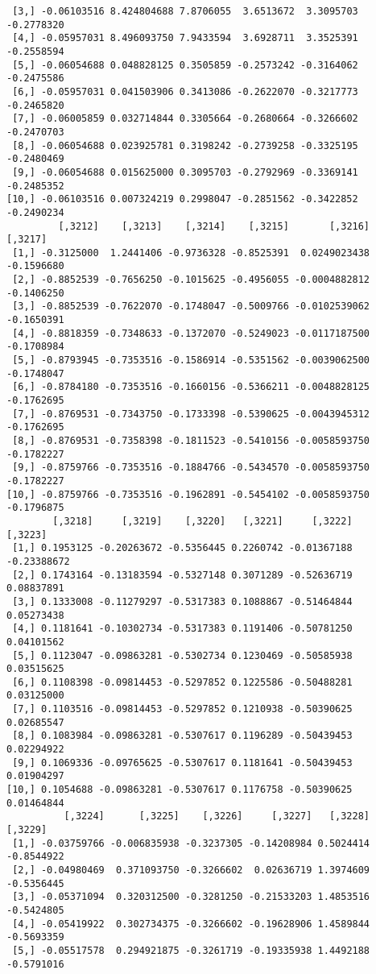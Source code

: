 \documentclass[
  letterpaper,
  DIV=11,
  numbers=noendperiod]{scrreprt}
\begin{document}
\begin{verbatim}
 [3,] -0.06103516 8.424804688 7.8706055  3.6513672  3.3095703 -0.2778320
 [4,] -0.05957031 8.496093750 7.9433594  3.6928711  3.3525391 -0.2558594
 [5,] -0.06054688 0.048828125 0.3505859 -0.2573242 -0.3164062 -0.2475586
 [6,] -0.05957031 0.041503906 0.3413086 -0.2622070 -0.3217773 -0.2465820
 [7,] -0.06005859 0.032714844 0.3305664 -0.2680664 -0.3266602 -0.2470703
 [8,] -0.06054688 0.023925781 0.3198242 -0.2739258 -0.3325195 -0.2480469
 [9,] -0.06054688 0.015625000 0.3095703 -0.2792969 -0.3369141 -0.2485352
[10,] -0.06103516 0.007324219 0.2998047 -0.2851562 -0.3422852 -0.2490234
         [,3212]    [,3213]    [,3214]    [,3215]       [,3216]    [,3217]
 [1,] -0.3125000  1.2441406 -0.9736328 -0.8525391  0.0249023438 -0.1596680
 [2,] -0.8852539 -0.7656250 -0.1015625 -0.4956055 -0.0004882812 -0.1406250
 [3,] -0.8852539 -0.7622070 -0.1748047 -0.5009766 -0.0102539062 -0.1650391
 [4,] -0.8818359 -0.7348633 -0.1372070 -0.5249023 -0.0117187500 -0.1708984
 [5,] -0.8793945 -0.7353516 -0.1586914 -0.5351562 -0.0039062500 -0.1748047
 [6,] -0.8784180 -0.7353516 -0.1660156 -0.5366211 -0.0048828125 -0.1762695
 [7,] -0.8769531 -0.7343750 -0.1733398 -0.5390625 -0.0043945312 -0.1762695
 [8,] -0.8769531 -0.7358398 -0.1811523 -0.5410156 -0.0058593750 -0.1782227
 [9,] -0.8759766 -0.7353516 -0.1884766 -0.5434570 -0.0058593750 -0.1782227
[10,] -0.8759766 -0.7353516 -0.1962891 -0.5454102 -0.0058593750 -0.1796875
        [,3218]     [,3219]    [,3220]   [,3221]     [,3222]     [,3223]
 [1,] 0.1953125 -0.20263672 -0.5356445 0.2260742 -0.01367188 -0.23388672
 [2,] 0.1743164 -0.13183594 -0.5327148 0.3071289 -0.52636719  0.08837891
 [3,] 0.1333008 -0.11279297 -0.5317383 0.1088867 -0.51464844  0.05273438
 [4,] 0.1181641 -0.10302734 -0.5317383 0.1191406 -0.50781250  0.04101562
 [5,] 0.1123047 -0.09863281 -0.5302734 0.1230469 -0.50585938  0.03515625
 [6,] 0.1108398 -0.09814453 -0.5297852 0.1225586 -0.50488281  0.03125000
 [7,] 0.1103516 -0.09814453 -0.5297852 0.1210938 -0.50390625  0.02685547
 [8,] 0.1083984 -0.09863281 -0.5307617 0.1196289 -0.50439453  0.02294922
 [9,] 0.1069336 -0.09765625 -0.5307617 0.1181641 -0.50439453  0.01904297
[10,] 0.1054688 -0.09863281 -0.5307617 0.1176758 -0.50390625  0.01464844
          [,3224]      [,3225]    [,3226]     [,3227]   [,3228]    [,3229]
 [1,] -0.03759766 -0.006835938 -0.3237305 -0.14208984 0.5024414 -0.8544922
 [2,] -0.04980469  0.371093750 -0.3266602  0.02636719 1.3974609 -0.5356445
 [3,] -0.05371094  0.320312500 -0.3281250 -0.21533203 1.4853516 -0.5424805
 [4,] -0.05419922  0.302734375 -0.3266602 -0.19628906 1.4589844 -0.5693359
 [5,] -0.05517578  0.294921875 -0.3261719 -0.19335938 1.4492188 -0.5791016

\end{verbatim}
\end{document}
